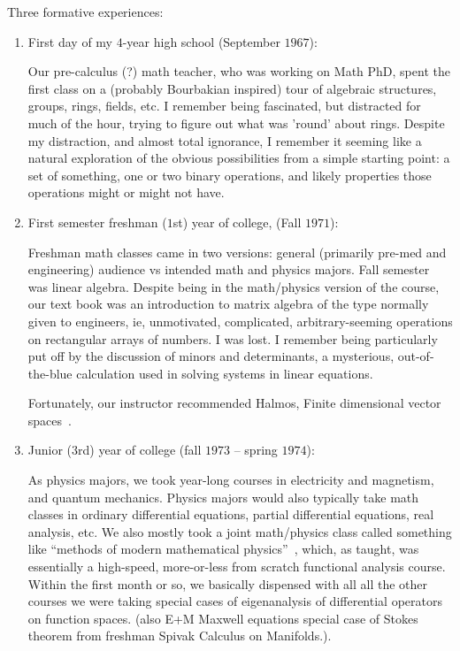 \documentclass[11pt,openany]{article}
\begin{document}
Three formative experiences:
\begin{enumerate}
  \item First day of my $4$-year high school (September $1967$):
  \par
  Our pre-calculus (?) math teacher, who was working on Math PhD,
  spent the first class on a (probably Bourbakian inspired) tour 
  of algebraic structures, groups, rings, fields, etc.
  I remember being fascinated, but distracted for much of the hour, 
  trying to figure out what was 'round' about rings.
  Despite my distraction, and almost total ignorance, 
  I remember it seeming like a natural exploration of the obvious
  possibilities from a simple starting point: a set of something,
  one or two binary operations, and likely properties those
  operations might or might not have.
 
  \item First semester freshman ($1$st) year of college,
  (Fall $1971$):
  \par
  Freshman math classes came in two versions: 
  general (primarily pre-med and engineering) audience
  vs intended math and physics majors. Fall semester was linear 
  algebra. Despite being in the math/physics version of the course,
  our text book was an introduction to matrix algebra of the type
  normally given to engineers, ie, unmotivated, complicated,
  arbitrary-seeming operations on rectangular arrays of numbers.
  I was lost. I remember being particularly put off by the 
  discussion of minors and determinants, a mysterious, 
  out-of-the-blue calculation used in solving systems in linear
  equations.
  \par
  Fortunately, our instructor recommended Halmos,
  \textsf{Finite dimensional vector 
  spaces}~\cite{Halmos1958Finite}. 
  
  \item Junior ($3$rd) year of college 
  (fall $1973$ -- spring $1974$):
  \par
  As physics majors, we took year-long courses in 
  electricity and magnetism, and quantum mechanics.
  Physics majors would also typically take math classes in
  ordinary differential equations, partial differential equations,
  real analysis, etc. We also mostly took a joint math/physics
  class called something like ``methods of modern mathematical 
  physics''~\cite{ReedSimon1972FunctionalAnalysis}, 
  which, as taught, was essentially a high-speed,
  more-or-less from scratch functional analysis course.
  Within the first month or so, we basically dispensed with all
  all the other courses we were taking special cases of 
  eigenanalysis of differential operators on function spaces.
  (also E+M Maxwell equations special case of Stokes theorem 
  from freshman Spivak Calculus on Manifolds.).
  
\end{enumerate}
\end{document}
